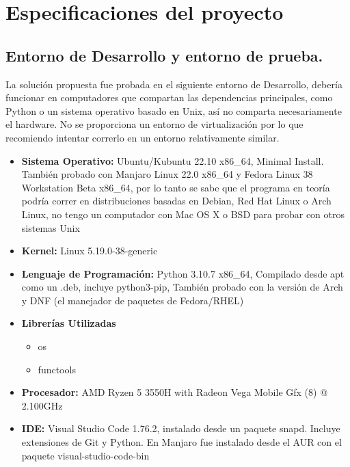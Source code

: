 \documentclass[a4paper]{article}
\begin{document}
\section{Especificaciones del proyecto}

\subsection{Entorno de Desarrollo y entorno de prueba.}

La solución propuesta fue probada en el siguiente entorno de Desarrollo, debería funcionar en
computadores que compartan las dependencias principales, como Python o un sistema operativo basado
en Unix, así no comparta necesariamente el hardware. No se proporciona un entorno de virtualización
por lo que recomiendo intentar correrlo en un entorno relativamente similar.

\begin{itemize}
    \item \textbf{Sistema Operativo: } Ubuntu/Kubuntu 22.10 x86\_64, Minimal Install. También probado con Manjaro Linux 22.0 x86\_64 y Fedora
    Linux 38 Workstation Beta x86\_64, por lo tanto se sabe que el programa en teoría podría correr en distribuciones basadas en Debian,
    Red Hat Linux o Arch Linux, no tengo un computador con Mac OS X o BSD para probar con otros sistemas Unix
    \item \textbf{Kernel: }Linux 5.19.0-38-generic
    \item \textbf{Lenguaje de Programación: }Python 3.10.7 x86\_64, Compilado desde apt como un .deb, incluye python3-pip,
    También probado con la versión de Arch y DNF (el manejador de paquetes de Fedora/RHEL)
    \item \textbf{Librerías Utilizadas}
    \begin{itemize}
        \item os
        \item functools
    \end{itemize}
    \item \textbf{Procesador: }AMD Ryzen 5 3550H with Radeon Vega Mobile Gfx (8) @ 2.100GHz 
    \item \textbf{IDE: } Visual Studio Code 1.76.2, instalado desde un paquete snapd. Incluye extensiones
    de Git y Python. En Manjaro fue instalado desde el AUR con el paquete visual-studio-code-bin
\end{itemize}
\end{document}
